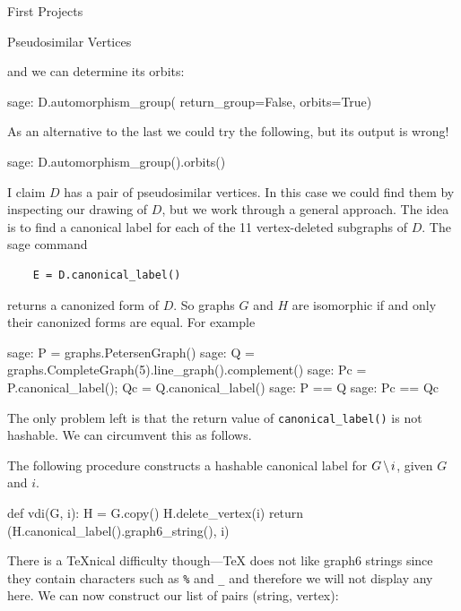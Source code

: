 \begin{chap}{First Projects}
\begin{sect}{Pseudosimilar Vertices}
\begin{para}
and we can determine its orbits:
\end{para}
%
\begin{sageexample}
    sage: D.automorphism_group( return_group=False, orbits=True)
\end{sageexample}
%
\begin{para}
As an alternative to the last we could try the following, but its
output is wrong!
\end{para}
%
\begin{sageexample}
    sage: D.automorphism_group().orbits()
\end{sageexample}
%
\begin{para}
I claim $D$ has a pair of pseudosimilar vertices. In this case we could find them
by inspecting our drawing of $D$, but we work through a general approach.
The idea is to find a canonical label for each of the 11 vertex-deleted subgraphs
of $D$. The sage command
\end{para}
%
\begin{verbatim}
    E = D.canonical_label()
\end{verbatim}
%
\begin{para}
returns a canonized form of $D$. So graphs $G$ and $H$ are isomorphic if and only
their canonized forms are equal. For example
\end{para}
%
\begin{sageexample}
    sage: P = graphs.PetersenGraph()
    sage: Q = graphs.CompleteGraph(5).line_graph().complement()
    sage: Pc = P.canonical_label(); Qc = Q.canonical_label()
    sage: P == Q
    sage: Pc == Qc
\end{sageexample}
%
\begin{para}
The only problem left is that the return value of \verb|canonical_label()|
is not hashable. We can circumvent this as follows.
\end{para}
%
\begin{para}
The following procedure constructs a hashable canonical label for 
$G\mathbin{\mkern-1.5mu\setminus\mkern-1.5mu} i$, given $G$ and $i$.
\end{para}
%
\begin{sageblock}
def vdi(G, i):
    H = G.copy()
    H.delete_vertex(i)
    return (H.canonical_label().graph6_string(), i)
\end{sageblock}
%
\begin{para}
There is a \TeX{}nical difficulty though---\TeX{} does not like graph6 strings
since they contain characters such as \verb|%| and \verb|_| and therefore we will not display 
any here. We can now construct our list of pairs (string, vertex):

\end{para}
\end{sect}
\end{chap}
